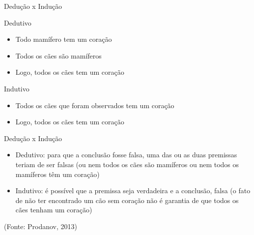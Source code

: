 \documentclass{beamer}
\begin{document}
\begin{frame}{Dedução x Indução}
  \begin{block}{Dedutivo}
    \begin{itemize}
    \item Todo mamífero tem um coração
    \item Todos os cães são mamíferos
    \item Logo, todos os cães tem um coração
    \end{itemize}
  \end{block}
  \begin{block}{Indutivo}
    \begin{itemize}
    \item Todos os cães que foram observados tem um coração
    \item Logo, todos os cães tem um coração
    \end{itemize}
  \end{block}
\end{frame}

\begin{frame}{Dedução x Indução}
  \begin{itemize}
  \item Dedutivo: para que a conclusão fosse falsa, uma das ou as duas
    premissas teriam de ser falsas (ou nem todos os cães são mamíferos
    ou nem todos os mamíferos têm um coração)
  \item Indutivo: é possível que a premissa seja verdadeira e a
    conclusão, falsa (o fato de não ter encontrado um cão sem coração
    não é garantia de que todos os cães tenham um coração)
  \end{itemize}

\vfill
(Fonte: Prodanov, 2013)
\end{frame}


\end{document}
